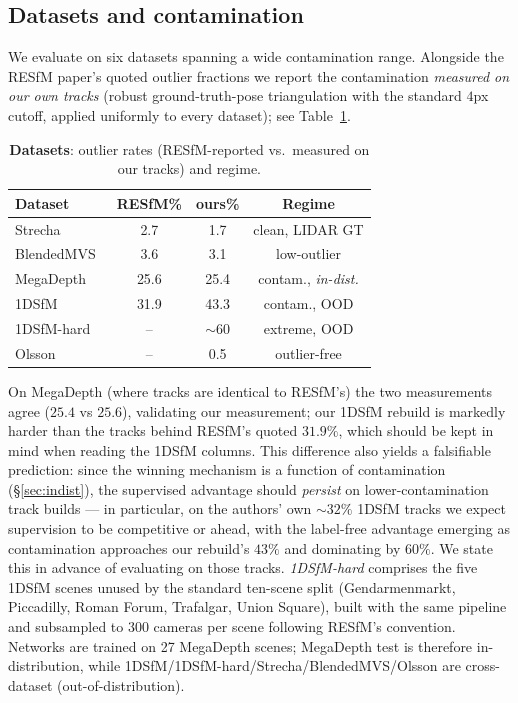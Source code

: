\documentclass{article}
\begin{document}
\subsection{Datasets and contamination}
We evaluate on six datasets spanning a wide contamination range. Alongside the RESfM
paper's quoted outlier fractions we report the contamination \emph{measured on our own
tracks} (robust ground-truth-pose triangulation with the standard $4$px cutoff, applied
uniformly to every dataset); see Table~\ref{tab:datasets}.
\begin{table}[t]\centering\footnotesize
\caption{\textbf{Datasets}: outlier rates (RESfM-reported vs.\ measured on our tracks) and regime.}
\label{tab:datasets}
\setlength{\tabcolsep}{1.2pt}%
\begin{tabular}{lccc}
\toprule
Dataset & RESfM\% & ours\% & Regime\\
\midrule
Strecha~\citep{strecha} & 2.7 & 1.7 & clean, LIDAR GT\\
BlendedMVS~\citep{blendedmvs} & 3.6 & 3.1 & low-outlier\\
MegaDepth~\citep{megadepth} & 25.6 & 25.4 & contam., \emph{in-dist.}\\
1DSfM~\citep{onedsfm} & 31.9 & 43.3 & contam., OOD\\
1DSfM-hard & -- & $\sim$60 & extreme, OOD\\
Olsson~\citep{olsson} & -- & 0.5 & outlier-free\\
\bottomrule
\end{tabular}
\end{table}
On MegaDepth (where tracks are identical to RESfM's) the two measurements agree
($25.4$ vs $25.6$), validating our measurement; our 1DSfM rebuild is markedly harder than
the tracks behind RESfM's quoted $31.9\%$, which should be kept in mind when reading the
1DSfM columns. This difference also yields a falsifiable prediction: since the winning
mechanism is a function of contamination (\S\ref{sec:indist}), the supervised advantage
should \emph{persist} on lower-contamination track builds --- in particular, on the
authors' own ${\sim}32\%$ 1DSfM tracks we expect supervision to be competitive or ahead,
with the label-free advantage emerging as contamination approaches our rebuild's $43\%$
and dominating by $60\%$. We state this in advance of evaluating on those tracks. \emph{1DSfM-hard} comprises the five 1DSfM scenes unused by the standard
ten-scene split (Gendarmenmarkt, Piccadilly, Roman Forum, Trafalgar, Union Square), built
with the same pipeline and subsampled to $300$ cameras per scene following RESfM's
convention. Networks are trained on 27 MegaDepth scenes; MegaDepth test is therefore
in-distribution, while 1DSfM/1DSfM-hard/Strecha/BlendedMVS/Olsson are cross-dataset
(out-of-distribution).
\end{document}

